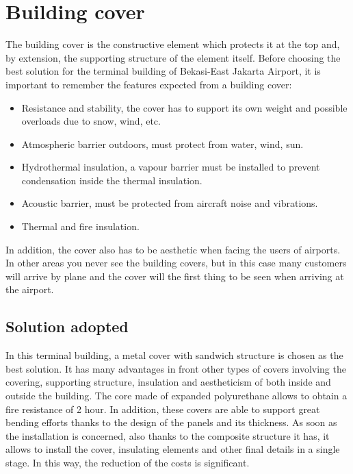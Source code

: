 \chapter{Building cover}

The building cover is the constructive element which protects it at the top and, by extension, the supporting structure of the element itself. Before choosing the best solution for the terminal building of Bekasi-East Jakarta Airport, it is important to remember the features expected from a building cover:

\begin{itemize}
	\item Resistance and stability, the cover has to support its own weight and possible overloads due to snow, wind, etc.
	\item Atmospheric barrier outdoors, must protect from water, wind, sun.
	\item Hydrothermal insulation, a vapour barrier must be installed to prevent condensation inside the thermal insulation.
	\item Acoustic barrier, must be protected from aircraft noise and vibrations.
	\item Thermal and fire insulation.
\end{itemize}

In addition, the cover also has to be aesthetic when facing the users of airports. In other areas you never see the building covers, but in this case many customers will arrive by plane and the cover will the first thing to be seen when arriving at the airport.

	\section{Solution adopted}
In this terminal building, a metal cover with sandwich structure is chosen as the best solution. It has many advantages in front other types of covers involving the covering, supporting structure, insulation and aestheticism of both inside and outside the building. The core made of expanded polyurethane allows to obtain a fire resistance of 2 hour. In addition, these covers are able to support great bending efforts thanks to the design of the panels and its thickness. As soon as the installation is concerned, also thanks to the composite structure it has, it allows to install the cover, insulating elements and other final details in a single stage. In this way, the reduction of the costs is significant.
	
